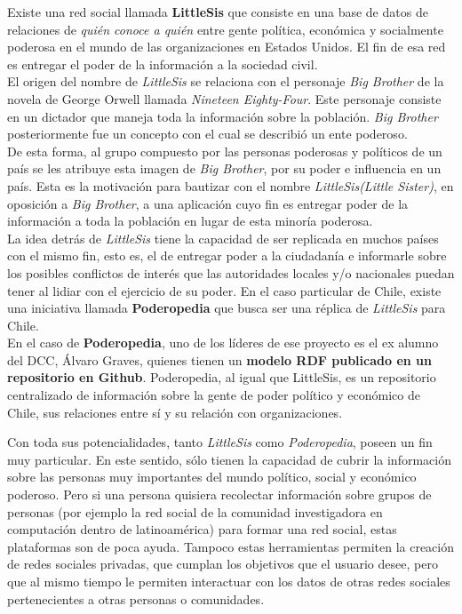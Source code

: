 \begin{intro}
  Existe una red social llamada \textbf{LittleSis}\cite{littlesis} que consiste en una base de datos de relaciones de \emph{quién conoce a quién} entre gente política, económica y socialmente poderosa en el mundo de las organizaciones en Estados Unidos. El fin de esa red es entregar el poder de la información a la sociedad civil.\\

  El origen del nombre de \emph{LittleSis} se relaciona con el personaje \emph{Big Brother} de la novela de George Orwell llamada \emph{Nineteen Eighty-Four}. Este personaje consiste en un dictador que maneja toda la información sobre la población. \emph{Big Brother} posteriormente fue un concepto con el cual se describió un ente poderoso.\\
 
  De esta forma, al grupo compuesto por las personas poderosas y políticos de un país se les atribuye esta imagen de \emph{Big Brother}, por su poder e influencia en un país. Esta es la motivación para bautizar con el nombre \emph{LittleSis}\emph{(Little Sister)}, en oposición a \emph{Big Brother}, a una aplicación cuyo fin es entregar poder de la información a toda la población en lugar de esta minoría poderosa.\\

  La idea detrás de \emph{LittleSis} tiene la capacidad de ser replicada en muchos países con el mismo fin, esto es, el de entregar poder a la ciudadanía e informarle sobre los posibles conflictos de interés que las autoridades locales y/o nacionales puedan tener al lidiar con el ejercicio de su poder. En el caso particular de Chile, existe una iniciativa llamada \textbf{Poderopedia}\cite{poderopedia} que busca ser una réplica de \emph{LittleSis} para Chile.\\

  En el caso de \textbf{Poderopedia}, uno de los líderes de ese proyecto es el ex alumno del DCC, Álvaro Graves, quienes tienen un \textbf{modelo RDF publicado en un repositorio en Github}\cite{podervocabulary}. Poderopedia, al igual que LittleSis, es un repositorio centralizado de información sobre la gente de poder político y económico de Chile, sus relaciones entre sí y su relación con organizaciones.

  Con toda sus potencialidades, tanto \emph{LittleSis} como \emph{Poderopedia}, poseen un fin muy particular. En este sentido, sólo tienen la capacidad de cubrir la información sobre las personas muy importantes del mundo político, social y económico poderoso. Pero si una persona quisiera recolectar información sobre grupos de personas (por ejemplo la red social de la comunidad investigadora en computación dentro de latinoamérica) para formar una red social, estas plataformas son de poca ayuda. Tampoco estas herramientas permiten la creación de redes sociales privadas, que cumplan los objetivos que el usuario desee, pero que al mismo tiempo le permiten interactuar con los datos de otras redes sociales pertenecientes a otras personas o comunidades.\\


\end{intro}

